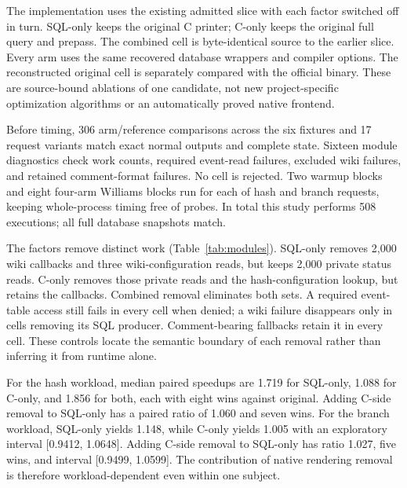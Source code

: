 \documentclass[acmsmall,screen,review,anonymous]{acmart}
\begin{document}
The implementation uses the existing admitted slice with each factor switched
off in turn. SQL-only keeps the original C printer; C-only keeps the original
full query and prepass. The combined cell is byte-identical source to the earlier
slice. Every arm uses the same recovered database wrappers and compiler options.
The reconstructed original cell is separately compared with the official binary.
These are source-bound ablations of one candidate, not new project-specific
optimization algorithms or an automatically proved native frontend.

Before timing, 306 arm/reference comparisons across the six fixtures and 17
request variants match exact normal outputs and complete state. Sixteen module
diagnostics check work counts, required event-read failures, excluded wiki
failures, and retained comment-format failures. No cell is rejected. Two warmup
blocks and eight four-arm Williams blocks run for each of hash and branch
requests, keeping whole-process timing free of probes. In total this study
performs 508 executions; all full database snapshots match.

\begin{table}[t]
\caption{Fossil module factorial. Times are eight-block arm medians. Work counts
are separate untimed diagnostics for the 2,000-row hash request, not total SQL
counts. The original cell uses reconstructed wrappers common to all cells.}
\label{tab:modules}
\small\ModuleResults
\end{table}

The factors remove distinct work (Table~\ref{tab:modules}). SQL-only removes
2,000 wiki callbacks and three wiki-configuration reads, but keeps 2,000 private
status reads. C-only removes those private reads and the hash-configuration
lookup, but retains the callbacks. Combined removal eliminates both sets.
A required event-table access still fails in every cell when denied; a wiki
failure disappears only in cells removing its SQL producer. Comment-bearing
fallbacks retain it in every cell. These controls locate the semantic boundary
of each removal rather than inferring it from runtime alone.

For the hash workload, median paired speedups are 1.719 for SQL-only, 1.088 for
C-only, and 1.856 for both, each with eight wins against original. Adding C-side
removal to SQL-only has a paired ratio of 1.060 and seven wins. For the branch
workload, SQL-only yields 1.148, while C-only yields 1.005 with an exploratory
interval [0.9412, 1.0648]. Adding C-side removal to SQL-only has ratio 1.027,
five wins, and interval [0.9499, 1.0599]. The contribution of native rendering
removal is therefore workload-dependent even within one subject.
\end{document}
